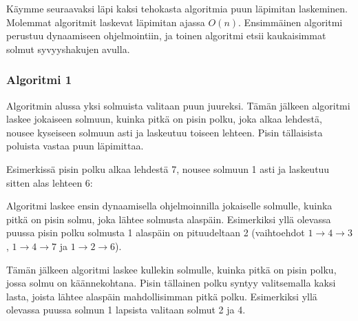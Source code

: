 Käymme seuraavaksi läpi kaksi tehokasta
algoritmia puun läpimitan laskeminen.
Molemmat algoritmit laskevat läpimitan ajassa
$O(n)$.
Ensimmäinen algoritmi perustuu dynaamiseen
ohjelmointiin, ja toinen algoritmi
etsii kaukaisimmat solmut syvyyshakujen avulla.

\subsubsection{Algoritmi 1}

Algoritmin alussa
yksi solmuista valitaan puun juureksi.
Tämän jälkeen algoritmi laskee
jokaiseen solmuun,
kuinka pitkä on pisin polku,
joka alkaa lehdestä,
nousee kyseiseen solmuun asti
ja laskeutuu toiseen lehteen.
Pisin tällaisista poluista vastaa puun läpimittaa.

Esimerkissä pisin polku alkaa lehdestä 7,
nousee solmuun 1 asti ja laskeutuu
sitten alas lehteen 6:
\begin{center}
\end{center}

Algoritmi laskee ensin dynaamisella ohjelmoinnilla
jokaiselle solmulle, kuinka pitkä on pisin solmu,
joka lähtee solmusta alaspäin.
Esimerkiksi yllä olevassa puussa pisin polku
solmusta 1 alaspäin on pituudeltaan 2
(vaihtoehdot $1 \rightarrow 4 \rightarrow 3$,
$1 \rightarrow 4 \rightarrow 7$ ja $1 \rightarrow 2 \rightarrow 6$).

Tämän jälkeen algoritmi laskee kullekin solmulle,
kuinka pitkä on pisin polku, jossa solmu on käännekohtana.
Pisin tällainen polku syntyy valitsemalla kaksi lasta,
joista lähtee alaspäin mahdollisimman pitkä polku.
Esimerkiksi yllä olevassa puussa solmun 1 lapsista valitaan solmut 2 ja 4.

